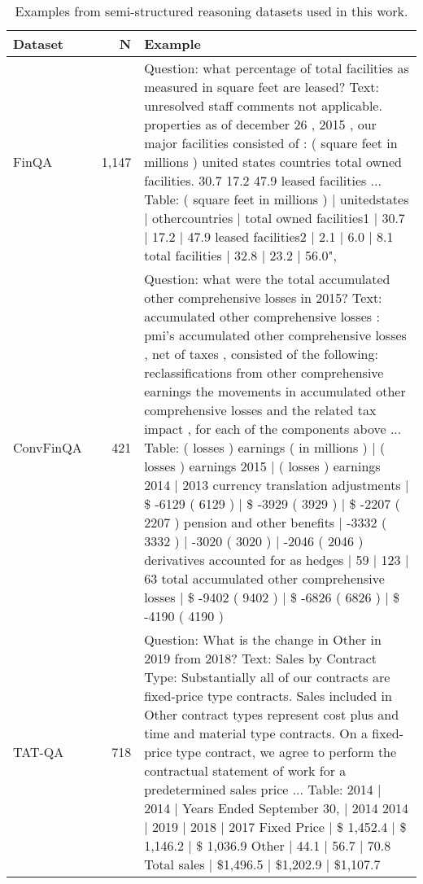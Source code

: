 \begin{table}[ht!]
\caption{Examples from semi-structured reasoning datasets used in this work.}
\centering
\begin{tabular}{@{}lrp{7.25cm}@{}}
\toprule
Dataset   & N     & Example                                                                                                \\ 
\midrule
FinQA~\citep{chen2021finqa} & 1,147 & Question: what percentage of total facilities as measured in square feet are leased? Text: unresolved staff comments not applicable. properties as of december 26 , 2015 , our major facilities consisted of : ( square feet in millions ) united states countries total owned facilities. 30.7 17.2 47.9 leased facilities ... Table: ( square feet in millions ) | unitedstates | othercountries | total owned facilities1 | 30.7 | 17.2 | 47.9 leased facilities2 | 2.1 | 6.0 | 8.1 total facilities | 32.8 | 23.2 | 56.0", \\
ConvFinQA~\citep{chen2022convfinqa} & 421 & Question: what were the total accumulated other comprehensive losses in 2015? Text: accumulated other comprehensive losses : pmi's accumulated other comprehensive losses , net of taxes , consisted of the following: reclassifications from other comprehensive earnings the movements in accumulated other comprehensive losses and the related tax impact , for each of the components above ... Table: ( losses ) earnings ( in millions ) | ( losses ) earnings 2015 | ( losses ) earnings 2014 | 2013 currency translation adjustments | \$ -6129 ( 6129 ) | \$ -3929 ( 3929 ) | \$ -2207 ( 2207 ) pension and other benefits | -3332 ( 3332 ) | -3020 ( 3020 ) | -2046 ( 2046 ) derivatives accounted for as hedges | 59 | 123 | 63 total accumulated other comprehensive losses | \$ -9402 ( 9402 ) | \$ -6826 ( 6826 ) | \$ -4190 ( 4190 ) \\
TAT-QA~\citep{zhu2021tatqa} & 718 & Question: What is the change in Other in 2019 from 2018? Text: Sales by Contract Type: Substantially all of our contracts are fixed-price type contracts. Sales included in Other contract types represent cost plus and time and material type contracts. On a fixed-price type contract, we agree to perform the contractual statement of work for a predetermined sales price ... Table: 2014 | 2014 | Years Ended September 30, | 2014 2014 | 2019 | 2018 | 2017 Fixed Price | \$ 1,452.4 | \$  1,146.2 | \$ 1,036.9 Other | 44.1 | 56.7 | 70.8 Total sales | \$1,496.5 | \$1,202.9 | \$1,107.7 \\

\bottomrule
\end{tabular}
\label{tab:semi:examples}
\end{table}

